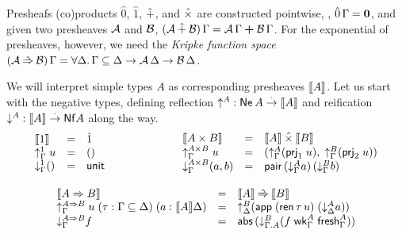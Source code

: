 \documentclass[a4paper,USenglish,cleveref, autoref]{lipics-v2019}
\begin{document}
Presheafs (co)products $\hat0$, $\hat1$, $\mathbin{\hat+}$, and $\mathbin{\hat\times}$ are
constructed pointwise, \eg, $\hat0\,\Gamma = \mbox{\textbf{0}}$, and given two
presheaves $\mathcal{A}$ and $\mathcal{B}$,
$(\mathcal{A} \mathbin{\hat+} \mathcal{B})\,\Gamma = \mathcal{A}\,\Gamma \boldsymbol{+} \mathcal{B}\,\Gamma$.  For the
exponential of presheaves, however, we need the \emph{Kripke function
  space}
$(\mathcal{A} \mathbin{\hat{\Rightarrow}} \mathcal{B})\,\Gamma = \forall \Delta.\, \Gamma \subseteq \Delta
\to \mathcal{A}\,\Delta \to \mathcal{B}\,\Delta$.

We will interpret simple types $A$ as corresponding presheaves
$\mathopen{{[\kern-0.14em[}} A \mathclose{{]\kern-0.14em]}}$.  Let us start with the negative types, defining
reflection $\mathord{\uparrow_{}^{A}} : \mathsf{Ne}^{}\, A \stackrel{\cdot}{\to} \mathopen{{[\kern-0.14em[}} A \mathclose{{]\kern-0.14em]}}$
and reification $\mathord{\downarrow_{}^{A}} : \mathopen{{[\kern-0.14em[}} A \mathclose{{]\kern-0.14em]}} \stackrel{\cdot}{\to} \mathsf{Nf} A$ along the way.
\begin{gather*}
\begin{array}{lcl}
  \den   \tyone          & = & \hatone \\
  \upG   \tyone \; u     & = & \ttempty \\
  \downG \tyone \ttempty & = & \tunit \\
\end{array}
\qquad\qquad\qquad
\begin{array}{lcl}
  \den   {A \times B}       & = & \den A \hattimes \den B \\
  \upG   {A \times B} \; u  & = & (\upG A (\prj1 u),\;\upG B (\prj2 u)) \\
  \downG {A \times B} (a,b) & = & \tpair\,(\downG A a)\,(\downG B b) \\
\end{array}
\\[2ex]
\begin{array}{lcl}
  \den {A \To B}    & = & \den A \hatto \den B \\
  \upG   {A \To B}    \; u \; (\tau : \Gamma \sublist \Delta) \; (a : \den A \Delta)
     & = & \up[\Delta] B (\tapp\;(\tren\,\tau\, u)\;(\down[\Delta] A a)) \\
  \downG {A \To B}    f        & = & \tabs\,(\down[\cext \Gamma A] B
    (f\;\twk^A_\Gamma\;\tfresh^A_\Gamma))
\end{array}
\end{gather*}
\end{document}
